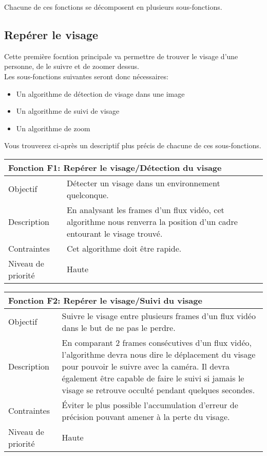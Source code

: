 \documentclass[overfullbox, poster]{polytech/polytech}
\begin{document}
Chacune de ces fonctions se décomposent en plusieurs sous-fonctions.

\subsection{Repérer le visage}
Cette première focntion principale va permettre de trouver le visage d'une personne, de le suivre et de zoomer dessus.\\
Les sous-fonctions suivantes seront donc nécessaires:
\begin{itemize}
\item Un algorithme de détection de visage dans une image
\item Un algorithme de suivi de visage
\item Un algorithme de zoom\\
\end{itemize}

Vous trouverez ci-après un descriptif plus précis de chacune de ces sous-fonctions.

\begin{tabular}{|l|p{12.5cm}|}
   \hline
   \multicolumn{2}{|l|}{\textbf{Fonction F1: Repérer le visage/Détection du visage}} \\
   \hline
   Objectif &Détecter un visage dans un environnement quelconque.\\
   \hline
   Description &En analysant les frames d'un flux vidéo, cet algorithme nous renverra la position d'un cadre entourant le visage trouvé.\\
   \hline
   Contraintes &Cet algorithme doit être rapide. \\
   \hline
   Niveau de priorité &Haute \\
   \hline
\end{tabular}

\begin{tabular}{|l|p{12.5cm}|}
   \hline
   \multicolumn{2}{|l|}{\textbf{Fonction F2: Repérer le visage/Suivi du visage}} \\
   \hline
   Objectif &Suivre le visage entre plusieurs frames d'un flux vidéo dans le but de ne pas le perdre. \\
   \hline
   Description &En comparant 2 frames consécutives d'un flux vidéo, l'algorithme devra nous dire le déplacement du visage pour pouvoir le suivre avec la caméra. Il devra également être capable de faire le suivi si jamais le visage se retrouve occulté pendant quelques secondes. \\
   \hline
   Contraintes &Éviter le plus possible l'accumulation d'erreur de précision pouvant amener à la perte du visage. \\
   \hline
   Niveau de priorité &Haute \\
   \hline
\end{tabular}
\end{document}

